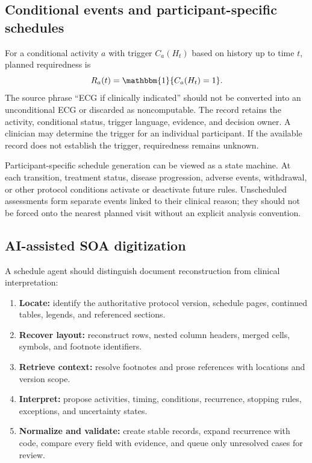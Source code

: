 \documentclass[12pt,oneside]{book}
\numberwithin{equation}{section}
\theoremstyle{definition}
\theoremstyle{plain}
\theoremstyle{remark}
\newcommand{\ind}{\mathbbm{1}}
\begin{document}
\subsection{Conditional events and participant-specific schedules}

For a conditional activity $a$ with trigger $C_a(H_t)$ based on history up to
time $t$, planned requiredness is
\[
  R_a(t)=\ind\{C_a(H_t)=1\}.
\]
The source phrase ``ECG if clinically indicated'' should not be converted into
an unconditional ECG or discarded as noncomputable.  The record retains the
activity, conditional status, trigger language, evidence, and decision owner.
A clinician may determine the trigger for an individual participant.  If the
available record does not establish the trigger, requiredness remains unknown.

Participant-specific schedule generation can be viewed as a state machine.
At each transition, treatment status, disease progression, adverse events,
withdrawal, or other protocol conditions activate or deactivate future rules.
Unscheduled assessments form separate events linked to their clinical reason;
they should not be forced onto the nearest planned visit without an explicit
analysis convention.

\subsection{AI-assisted SOA digitization}

A schedule agent should distinguish document reconstruction from clinical
interpretation:
\begin{enumerate}
    \item \textbf{Locate:} identify the authoritative protocol version,
    schedule pages, continued tables, legends, and referenced sections.
    \item \textbf{Recover layout:} reconstruct rows, nested column headers,
    merged cells, symbols, and footnote identifiers.
    \item \textbf{Retrieve context:} resolve footnotes and prose references
    with locations and version scope.
    \item \textbf{Interpret:} propose activities, timing, conditions,
    recurrence, stopping rules, exceptions, and uncertainty states.
    \item \textbf{Normalize and validate:} create stable records, expand
    recurrence with code, compare every field with evidence, and queue only
    unresolved cases for review.
\end{enumerate}
\end{document}
